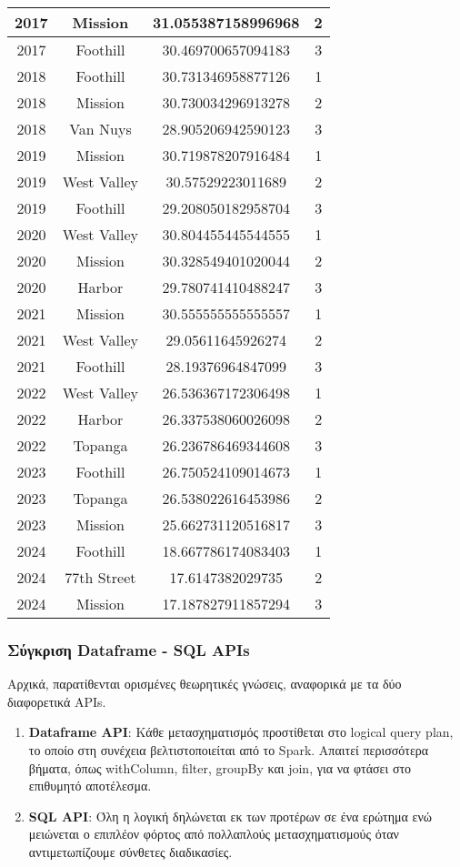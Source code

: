 \documentclass{article}
\begin{document}
\begin{table}[h!]
\begin{tabular}{|c|c|c|c|}
2017 & Mission & 31.055387158996968 & 2 \\ \hline
2017 & Foothill & 30.469700657094183 & 3 \\ \hline
2018 & Foothill & 30.731346958877126 & 1 \\ \hline
2018 & Mission & 30.730034296913278 & 2 \\ \hline
2018 & Van Nuys & 28.905206942590123 & 3 \\ \hline
2019 & Mission & 30.719878207916484 & 1 \\ \hline
2019 & West Valley & 30.57529223011689 & 2 \\ \hline
2019 & Foothill & 29.208050182958704 & 3 \\ \hline
2020 & West Valley & 30.804455445544555 & 1 \\ \hline
2020 & Mission & 30.328549401020044 & 2 \\ \hline
2020 & Harbor & 29.780741410488247 & 3 \\ \hline
2021 & Mission & 30.555555555555557 & 1 \\ \hline
2021 & West Valley & 29.05611645926274 & 2 \\ \hline
2021 & Foothill & 28.19376964847099 & 3 \\ \hline
2022 & West Valley & 26.536367172306498 & 1 \\ \hline
2022 & Harbor & 26.337538060026098 & 2 \\ \hline
2022 & Topanga & 26.236786469344608 & 3 \\ \hline
2023 & Foothill & 26.750524109014673 & 1 \\ \hline
2023 & Topanga & 26.538022616453986 & 2 \\ \hline
2023 & Mission & 25.662731120516817 & 3 \\ \hline
2024 & Foothill & 18.667786174083403 & 1 \\ \hline
2024 & 77th Street & 17.6147382029735 & 2 \\ \hline
2024 & Mission & 17.187827911857294 & 3 \\ \hline
\end{tabular}
\end{table}

\subsubsection*{Σύγκριση Dataframe - SQL APIs}
Αρχικά, παρατίθενται ορισμένες θεωρητικές γνώσεις, αναφορικά με τα δύο διαφορετικά APIs. 
\begin{enumerate}
	\item \textbf{Dataframe API}: Κάθε μετασχηματισμός προστίθεται στο logical query plan, το οποίο
		στη συνέχεια βελτιστοποιείται από το Spark. Απαιτεί περισσότερα βήματα, όπως
		withColumn, filter, groupBy και join, για να φτάσει στο επιθυμητό αποτέλεσμα.
	\item \textbf{SQL API}: Όλη η λογική δηλώνεται εκ των προτέρων σε ένα ερώτημα ενώ μειώνεται ο
		επιπλέον φόρτος από πολλαπλούς μετασχηματισμούς όταν αντιμετωπίζουμε
		σύνθετες διαδικασίες.
\end{enumerate}
\end{document}
